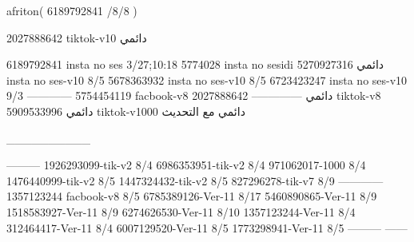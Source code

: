 afriton(
6189792841 /8/8
)

2027888642 tiktok-v10
دائمي

6189792841 insta no ses
3/27;10:18
5774028 insta no sesidi
دائمي
5270927316 insta no ses-v10
8/5
5678363932 insta no ses-v10
8/5
6723423247 insta no ses-v10
9/3
------------
5754454119 facbook-v8
دائمي
--------------
2027888642 tiktok-v8
دائمي
5909533996 tiktok-v1000
دائمي مع التحديث

__________

---------
1926293099-tik-v2
8/4
6986353951-tik-v2
8/4
971062017-1000
8/4
1476440999-tik-v2
8/5
1447324432-tik-v2
8/5
827296278-tik-v7
8/9
------------
1357123244 facbook-v8
8/5
6785389126-Ver-11
8/17
5460890865-Ver-11
8/9
1518583927-Ver-11
8/9
6274626530-Ver-11
8/10
1357123244-Ver-11
8/4
312464417-Ver-11
8/4
6007129520-Ver-11
8/5
1773298941-Ver-11
8/5
---------
------
